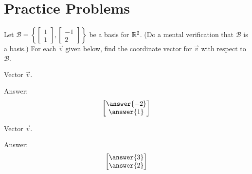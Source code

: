 \documentclass{ximera}
\begin{document}
\section*{Practice Problems}
\begin{problem}
Let $\mathcal{B}=\left\{\begin{bmatrix}1\\1\end{bmatrix},\begin{bmatrix}-1\\2\end{bmatrix}\right\}$ be a basis for $\mathbb{R}^2$.  (Do a mental verification that $\mathcal{B}$ is a basis.)  For each $\vec{v}$ given below, find the coordinate vector for $\vec{v}$ with respect to $\mathcal{B}$.
  \begin{problem}\label{prob:coordvect1}
 Vector $\vec{v}$. 
  \begin{center}
\end{center}

Answer:
$$\begin{bmatrix}\answer{-2}\\\answer{1}\end{bmatrix}$$
  \end{problem}
  
  \begin{problem}\label{prob:coordvect2}
  Vector $\vec{v}$.
  \begin{center}
\end{center}
Answer:
$$\begin{bmatrix}\answer{3}\\\answer{2}\end{bmatrix}$$
  \end{problem}
\end{problem}
\end{document}
